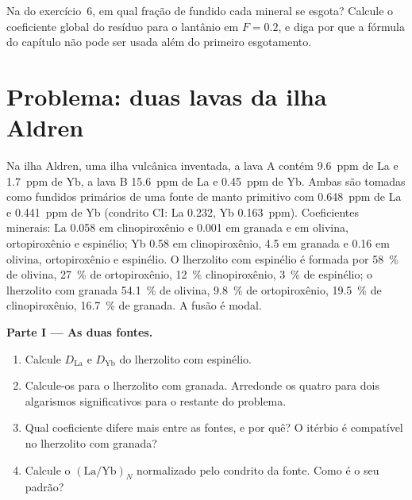\begin{exercise}[$\star\star\star$]\label{exo:b3:trace-element-modelling:12}
Na  do exercício~6, em qual fração de fundido cada mineral
se esgota? Calcule o coeficiente global do resíduo para o lantânio em
$F = 0.2$, e diga por que a fórmula do capítulo não pode ser usada além do
primeiro esgotamento.
\end{exercise}

\section{Problema: duas lavas da ilha Aldren}

\begin{problem}\label{pb:b3:trace-element-modelling:1}
Na ilha Aldren, uma ilha vulcânica inventada, a lava A contém \qty{9.6}{ppm} de La
e \qty{1.7}{ppm} de Yb, a lava B \qty{15.6}{ppm} de La e \qty{0.45}{ppm} de Yb.
Ambas são tomadas como fundidos primários de uma fonte de manto primitivo com
\qty{0.648}{ppm} de La e \qty{0.441}{ppm} de Yb (condrito CI: La 0.232, Yb
\qty{0.163}{ppm}). Coeficientes minerais: La 0.058 em clinopiroxênio e 0.001
em granada e em olivina, ortopiroxênio e espinélio; Yb 0.58 em
clinopiroxênio, 4.5 em granada e 0.16 em olivina, ortopiroxênio e espinélio.
O lherzolito com espinélio é formada por \qty{58}{\percent} de olivina, \qty{27}{\percent} de ortopiroxênio, \qty{12}{\percent}
clinopiroxênio, \qty{3}{\percent} de espinélio; o lherzolito com granada \qty{54.1}{\percent} de olivina, \qty{9.8}{\percent}
de ortopiroxênio, \qty{19.5}{\percent} de clinopiroxênio, \qty{16.7}{\percent} de granada. A fusão é modal.

\medskip\noindent\textbf{Parte I --- As duas fontes.}
\begin{enumerate}
\item Calcule $D_{\mathrm{La}}$ e $D_{\mathrm{Yb}}$ do lherzolito com espinélio.
\item Calcule-os para o lherzolito com granada. Arredonde os quatro para dois algarismos significativos
para o restante do problema.
\item Qual coeficiente difere mais entre as fontes, e por quê? O itérbio é
compatível no lherzolito com granada?
\item Calcule o $(\mathrm{La}/\mathrm{Yb})_N$ normalizado pelo condrito da
fonte. Como é o seu padrão?
\end{enumerate}


\end{problem}
